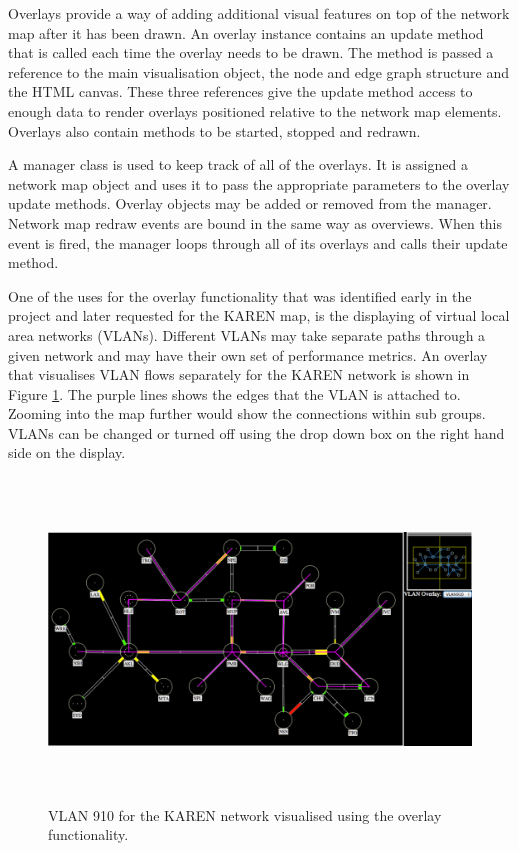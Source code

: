 \documentclass[11pt, a4paper]{article}
\begin{document}
Overlays provide a way of adding additional visual features on top of the
network map after it has been drawn. An overlay instance contains an update
method that is called each time the overlay needs to be drawn. The method is
passed a reference to the main visualisation object, the node and edge graph
structure and the HTML canvas. These three references give the update method
access to enough data to render overlays positioned relative to the network map
elements. Overlays also contain methods to be started, stopped and redrawn.

A manager class is used to keep track of all of the overlays. It is assigned a
network map object and uses it to pass the appropriate parameters to the overlay
update methods. Overlay objects may be added or removed from the manager.
Network map redraw events are bound in the same way as overviews. When this
event is fired, the manager loops through all of its overlays and calls their
update method. 

One of the uses for the overlay functionality that was identified early in the
project and later requested for the KAREN map, is the displaying of virtual
local area networks (VLANs). Different VLANs may take separate paths through a
given network and may have their own set of performance metrics. An overlay that
visualises VLAN flows separately for the KAREN network is shown in Figure
\ref{fig:overlays1.0}. The purple lines shows the edges that the VLAN is
attached to. Zooming into the map further would show the connections within sub
groups. VLANs can be changed or turned off using the drop down box on the right
hand side on the display.

\begin{figure} 
\centering
\includegraphics[width=170mm,height=85.71mm]{assets/overlays1-0.pdf}
\caption{VLAN 910 for the KAREN network visualised using the overlay
functionality.}
\label{fig:overlays1.0} 
\end{figure}
\end{document}
